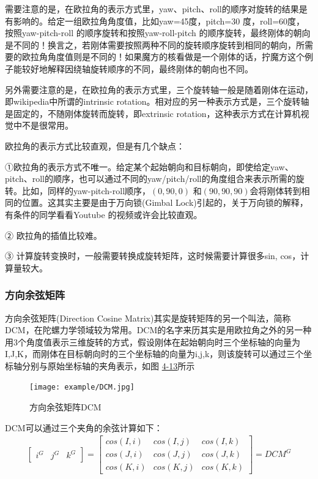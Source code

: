 需要注意的是，在欧拉角的表示方式里，yaw、pitch、roll的顺序对旋转的结果是有影响的。给定一组欧拉角角度值，比如yaw=45度，pitch=30 度，roll=60度，按照yaw-pitch-roll 的顺序旋转和按照yaw-roll-pitch 的顺序旋转，最终刚体的朝向是不同的！换言之，若刚体需要按照两种不同的旋转顺序旋转到相同的朝向，所需要的欧拉角角度值则是不同的！如果魔方的核看做是一个刚体的话，拧魔方这个例子能较好地解释因绕轴旋转顺序的不同，最终刚体的朝向也不同。

另外需要注意的是，在欧拉角的表示方式里，三个旋转轴一般是随着刚体在运动，即wikipedia中所谓的intrinsic rotation。相对应的另一种表示方式是，三个旋转轴是固定的，不随刚体旋转而旋转，即extrinsic rotation，这种表示方式在计算机视觉中不是很常用。

欧拉角的表示方式比较直观，但是有几个缺点：

①欧拉角的表示方式不唯一。给定某个起始朝向和目标朝向，即使给定yaw、pitch、roll的顺序，也可以通过不同的yaw/pitch/roll的角度组合来表示所需的旋转。比如，同样的yaw-pitch-roll顺序，$(0,90,0)$ 和$(90,90,90)$会将刚体转到相同的位置。这其实主要是由于万向锁(Gimbal Lock)引起的，关于万向锁的解释，有条件的同学看看Youtube 的视频或许会比较直观。

② 欧拉角的插值比较难。

③ 计算旋转变换时，一般需要转换成旋转矩阵，这时候需要计算很多sin, cos，计算量较大。

\subsubsection{方向余弦矩阵}

方向余弦矩阵(Direction Cosine Matrix)其实是旋转矩阵的另一个叫法，简称DCM，在陀螺力学领域较为常用。DCM的名字来历其实是用欧拉角之外的另一种用3个角度值表示三维旋转的方式，假设刚体在起始朝向时三个坐标轴的向量为I,J,K，而刚体在目标朝向时的三个坐标轴的向量为i,j,k，则该旋转可以通过三个坐标轴分别与原始坐标轴的夹角表示，如图
\href{fig:4-13}{4-13}所示

\begin{figure}[!htp]
\centering
\texttt{[image: example/DCM.jpg]}
\caption{方向余弦矩阵DCM}
\label{fig1:4-13}
\end{figure}

DCM可以通过三个夹角的余弦计算如下：
\begin{align}
\begin{bmatrix}
i^G & j^G & k^G
\end{bmatrix}
=
\begin{bmatrix}
cos(I,i) & cos(I,j) & cos(I,k) \\
cos(J,i) & cos(J,j) & cos(J,k) \\
cos(K,i) & cos(K,j) & cos(K,k)
\end{bmatrix}
=
DCM^G
\end{align}

